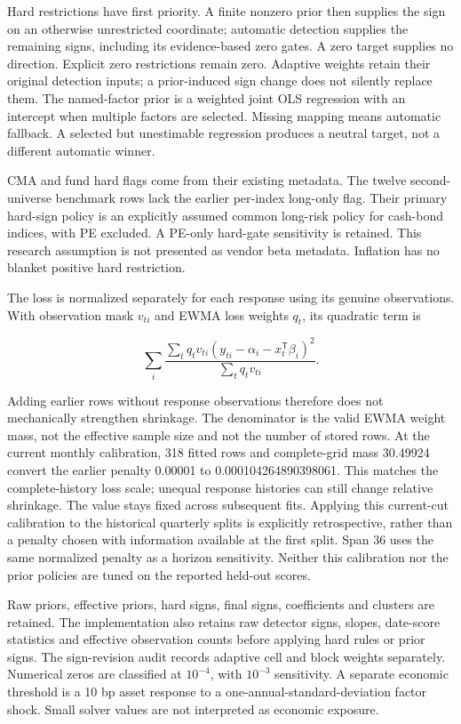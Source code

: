 \documentclass[a4paper,review]{cas-sc}
\begin{document}
Hard restrictions have first priority. A finite nonzero prior then supplies the sign on an otherwise unrestricted coordinate; automatic detection supplies the remaining signs, including its evidence-based zero gates. A zero target supplies no direction. Explicit zero restrictions remain zero. Adaptive weights retain their original detection inputs; a prior-induced sign change does not silently replace them. The named-factor prior is a weighted joint OLS regression with an intercept when multiple factors are selected. Missing mapping means automatic fallback. A selected but unestimable regression produces a neutral target, not a different automatic winner.

CMA and fund hard flags come from their existing metadata. The twelve second-universe benchmark rows lack the earlier per-index long-only flag. Their primary hard-sign policy is an explicitly assumed common long-risk policy for cash-bond indices, with PE excluded. A PE-only hard-gate sensitivity is retained. This research assumption is not presented as vendor beta metadata. Inflation has no blanket positive hard restriction.

The loss is normalized separately for each response using its genuine observations. With observation mask $v_{ti}$ and EWMA loss weights $q_t$, its quadratic term is

\begin{equation}
\sum_i \frac{\sum_t q_t v_{ti}(y_{ti}-\alpha_i-x_t^{\mathsf T}\beta_i)^2}{\sum_t q_t v_{ti}}.
\end{equation}

Adding earlier rows without response observations therefore does not mechanically strengthen shrinkage. The denominator is the valid EWMA weight mass, not the effective sample size and not the number of stored rows. At the current monthly calibration, 318 fitted rows and complete-grid mass 30.49924 convert the earlier penalty 0.00001 to 0.000104264890398061. This matches the complete-history loss scale; unequal response histories can still change relative shrinkage. The value stays fixed across subsequent fits. Applying this current-cut calibration to the historical quarterly splits is explicitly retrospective, rather than a penalty chosen with information available at the first split. Span 36 uses the same normalized penalty as a horizon sensitivity. Neither this calibration nor the prior policies are tuned on the reported held-out scores.

Raw priors, effective priors, hard signs, final signs, coefficients and clusters are retained. The implementation also retains raw detector signs, slopes, date-score statistics and effective observation counts before applying hard rules or prior signs. The sign-revision audit records adaptive cell and block weights separately. Numerical zeros are classified at $10^{-4}$, with $10^{-3}$ sensitivity. A separate economic threshold is a 10 bp asset response to a one-annual-standard-deviation factor shock. Small solver values are not interpreted as economic exposure.
\end{document}
